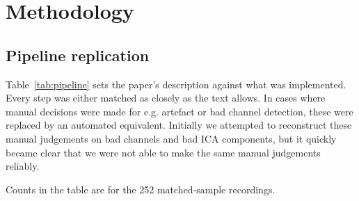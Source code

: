 \documentclass[10pt,a4paper]{article}
\begin{document}

\section{Methodology}

\subsection{Pipeline replication}
\label{sec:process}

Table~\ref{tab:pipeline} sets the paper's description against what was implemented. Every step was
either matched as closely as the text allows.
In cases where manual decisions were made for e.g. artefact or bad channel detection, 
these were replaced by an automated equivalent. Initially we attempted to reconstruct
these manual judgements on bad channels and bad ICA components, but it quickly 
became clear that we were not able to make the same manual judgements reliably.

Counts in the table are for the 252 matched-sample recordings.
\end{document}
